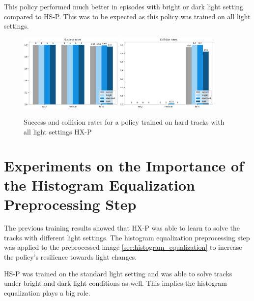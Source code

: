 This policy performed much better in episodes with bright or dark light setting compared to \ac{HS-P}. This was to be expected as this policy was trained on all light settings.

\begin{figure}
    \centering
    \includegraphics[width=0.45\textwidth]{Bilder/notebook_images/hardDistanceMixedLight_eval_all_success_rates_barplot.png}
    \includegraphics[width=0.45\textwidth]{Bilder/notebook_images/hardDistanceMixedLight_eval_all_collision_rates_barplot.png}
    \caption{Success and collision rates for a policy trained on hard tracks with all light settings \ac{HX-P}}
    \label{fig:hardDistance_mixedLightTraining_results}
\end{figure}



\section{Experiments on the Importance of the Histogram Equalization Preprocessing Step}
\label{sec:importance_histogram_equalization}

The previous training results showed that \ac{HX-P} was able to learn to solve the tracks with different light settings. The histogram equalization preprocessing step was applied to the preprocessed image \ref{sec:histogram_equalization} to increase the policy's resilience towards light changes.

\ac{HS-P} was trained on the standard light setting and was able to solve tracks under bright and dark light conditions as well. This implies the histogram equalization plays a big role.

